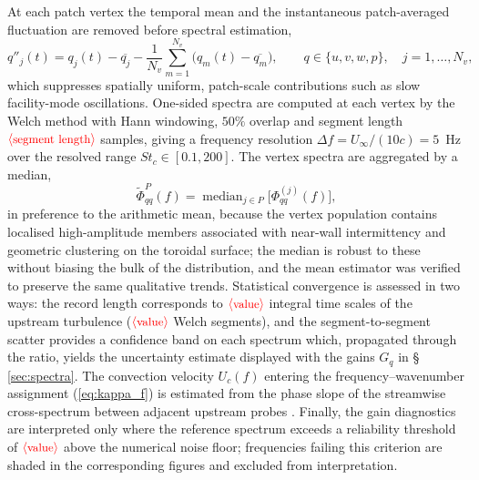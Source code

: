 \documentclass[lineno]{JFM-FLM_Au}
\newcommand{\tbd}[1]{\textcolor{red}{\ensuremath{\langle\mbox{\small #1}\rangle}}}
\begin{document}
At each patch vertex the temporal mean and the instantaneous
patch-averaged fluctuation are removed before spectral estimation,
\begin{equation}
  q''_j(t)
  = q_j(t) - \overline{q_j}
  - \frac{1}{N_v}\sum_{m=1}^{N_v}\big(q_m(t)-\overline{q_m}\big),
  \qquad q \in \{u,v,w,p\},
  \quad j = 1,\dots,N_v,
  \label{eq:patch_fluct}
\end{equation}
which suppresses spatially uniform, patch-scale contributions such as
slow facility-mode oscillations. One-sided spectra are computed at each
vertex by the Welch method \citep{Welch1967} with Hann windowing, $50\%$
overlap and segment length $\tbd{segment length}$ samples, giving a frequency
resolution $\Delta f = U_\infty/(10c) = 5$~Hz over the resolved range
$St_c \in [0.1, 200]$. The vertex spectra are aggregated by a median,
\begin{equation}
  \widetilde{\Phi}^{P}_{qq}(f)
  = \operatorname{median}_{j\in P}\big[\Phi^{(j)}_{qq}(f)\big],
  \label{eq:patch_spectrum}
\end{equation}
in preference to the arithmetic mean, because the vertex population
contains localised high-amplitude members associated with near-wall
intermittency and geometric clustering on the toroidal surface; the
median is robust to these without biasing the bulk of the distribution,
and the mean estimator was verified to preserve the same qualitative
trends. Statistical convergence is assessed in two ways: the record
length corresponds to $\tbd{value}$ integral time scales of the upstream
turbulence ($\tbd{value}$ Welch segments), and the segment-to-segment
scatter provides a confidence band on each spectrum which, propagated
through the ratio, yields the uncertainty estimate displayed with the
gains $G_q$ in \S\,\ref{sec:spectra}.
The convection velocity $U_c(f)$ entering the frequency--wavenumber
assignment (\ref{eq:kappa_f}) is estimated from the phase slope of the
streamwise cross-spectrum between adjacent upstream probes
\citep{DelAlamoJimenez2009}. Finally, the gain diagnostics are
interpreted only where the reference spectrum exceeds a reliability
threshold of $\tbd{value}$
above the numerical noise floor; frequencies failing this criterion are
shaded in the corresponding figures and excluded from interpretation.
\end{document}
